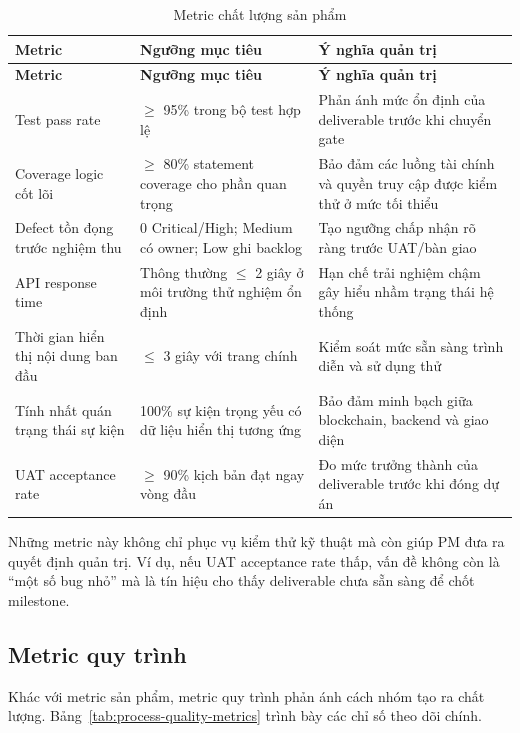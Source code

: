 \begin{longtable}{| p{4.2cm} | p{3.2cm} | p{5.2cm} |}
\caption{Metric chất lượng sản phẩm}\label{tab:product-quality-metrics}\\
\hline
\textbf{Metric} & \textbf{Ngưỡng mục tiêu} & \textbf{Ý nghĩa quản trị} \\
\hline
\endfirsthead
\hline
\textbf{Metric} & \textbf{Ngưỡng mục tiêu} & \textbf{Ý nghĩa quản trị} \\
\hline
\endhead
Test pass rate & $\geq$ 95\% trong bộ test hợp lệ & Phản ánh mức ổn định của deliverable trước khi chuyển gate \\ \hline
Coverage logic cốt lõi & $\geq$ 80\% statement coverage cho phần quan trọng & Bảo đảm các luồng tài chính và quyền truy cập được kiểm thử ở mức tối thiểu \\ \hline
Defect tồn đọng trước nghiệm thu & 0 Critical/High; Medium có owner; Low ghi backlog & Tạo ngưỡng chấp nhận rõ ràng trước UAT/bàn giao \\ \hline
API response time & Thông thường $\leq$ 2 giây ở môi trường thử nghiệm ổn định & Hạn chế trải nghiệm chậm gây hiểu nhầm trạng thái hệ thống \\ \hline
Thời gian hiển thị nội dung ban đầu & $\leq$ 3 giây với trang chính & Kiểm soát mức sẵn sàng trình diễn và sử dụng thử \\ \hline
Tính nhất quán trạng thái sự kiện & 100\% sự kiện trọng yếu có dữ liệu hiển thị tương ứng & Bảo đảm minh bạch giữa blockchain, backend và giao diện \\ \hline
UAT acceptance rate & $\geq$ 90\% kịch bản đạt ngay vòng đầu & Đo mức trưởng thành của deliverable trước khi đóng dự án \\
\hline
\end{longtable}

Những metric này không chỉ phục vụ kiểm thử kỹ thuật mà còn giúp PM đưa ra quyết định quản trị. Ví dụ, nếu UAT acceptance rate thấp, vấn đề không còn là ``một số bug nhỏ'' mà là tín hiệu cho thấy deliverable chưa sẵn sàng để chốt milestone.

\subsection{Metric quy trình}

Khác với metric sản phẩm, metric quy trình phản ánh cách nhóm tạo ra chất lượng. Bảng~\ref{tab:process-quality-metrics} trình bày các chỉ số theo dõi chính.

